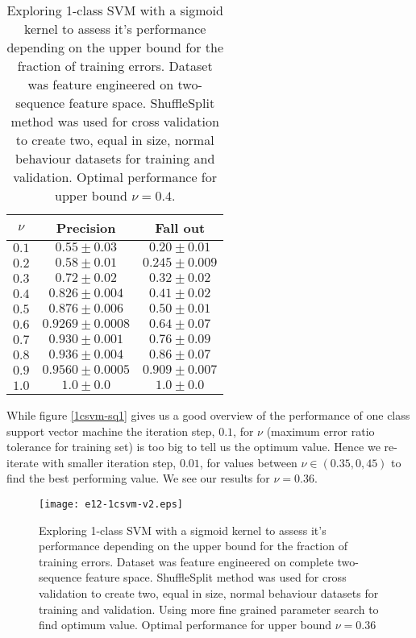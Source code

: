 \documentclass[reqno,openany,12pt]{amsbook}
\begin{document}
\begin{table}
\begin{tabular}{|c|c|c|}
\hline
$\nu$ &  Precision & Fall out \\ \hline 
$0.1$ &  $0.55 \pm 0.03$ & $0.20 \pm 0.01$ \\ \hline 
$0.2$ &  $0.58 \pm 0.01$ & $0.245 \pm 0.009$ \\ \hline 
$0.3$ &  $0.72 \pm 0.02$ & $0.32 \pm 0.02$ \\ \hline 
$0.4$ &  $0.826 \pm 0.004$ & $0.41 \pm 0.02$ \\ \hline 
$0.5$ &  $0.876 \pm 0.006$ & $0.50 \pm 0.01$ \\ \hline 
$0.6$ &  $0.9269 \pm 0.0008$ & $0.64 \pm 0.07$ \\ \hline 
$0.7$ &  $0.930 \pm 0.001$ & $0.76 \pm 0.09$ \\ \hline 
$0.8$ &  $0.936 \pm 0.004$ & $0.86 \pm 0.07$ \\ \hline 
$0.9$ &  $0.9560 \pm 0.0005$ & $0.909 \pm 0.007$ \\ \hline
$1.0$ &  $1.0 \pm 0.0$ & $1.0 \pm 0.0$ \\ \hline
\end{tabular}
\vspace{5pt}
\caption[1-class SVM performance depending on bound for training errors]{Exploring 1-class SVM with a sigmoid kernel to assess it's performance depending on the upper bound for the fraction of training errors. Dataset was feature engineered on two-sequence feature space. ShuffleSplit method was used for cross validation to create two, equal in size, normal behaviour datasets for training and validation. Optimal performance for upper bound $\nu = 0.4$.} %
\label{1csvmt3}
\end{table}

While figure \ref{1csvm-sq1} gives us a good overview of the performance of one class support vector machine the iteration step, $0.1$, for $\nu$ (maximum error ratio tolerance for training set) is too big to tell us the optimum value. Hence we re-iterate with smaller iteration step, $0.01$, for values between $\nu \in (0.35, 0,45)$ to find the best performing value. We see our results for $\nu=0.36$.

\begin{figure}[thb]
\texttt{[image: e12-1csvm-v2.eps]}
\caption[1-class SVM performance depending on bound for training errors]{Exploring 1-class SVM with a sigmoid kernel to assess it's performance depending on the upper bound for the fraction of training errors. Dataset was feature engineered on complete two-sequence feature space. ShuffleSplit method was used for cross validation to create two, equal in size, normal behaviour datasets for training and validation. Using more fine grained parameter search to find optimum value. Optimal performance for upper bound $\nu = 0.36$ }
\label{1csvm-sq2}
\end{figure}
\end{document}
